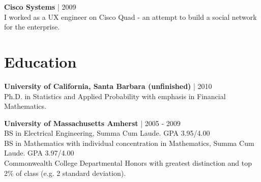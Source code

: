 \documentclass[a4paper,10pt]{article}
\begin{document}
\vspace{5pt} %

\noindent
\textbf{Cisco Systems} | 2009 \\
I worked as a UX engineer on Cisco Quad - an attempt to build a social network for the enterprise.

\section*{Education}

\noindent
\textbf{University of California, Santa Barbara (unfinished)} | 2010 \\
Ph.D. in Statistics and Applied Probability with emphasis in Financial Mathematics.

\vspace{5pt} %

\noindent
\textbf{University of Massachusetts Amherst} | 2005 - 2009 \\
BS in Electrical Engineering, Summa Cum Laude. GPA 3.95/4.00 \\
BS in Mathematics with individual concentration in Mathematics, Summa Cum Laude. GPA 3.97/4.00 \\
Commonwealth College Departmental Honors with greatest distinction and top 2\% of class (e.g. 2 standard deviation).
\end{document}
